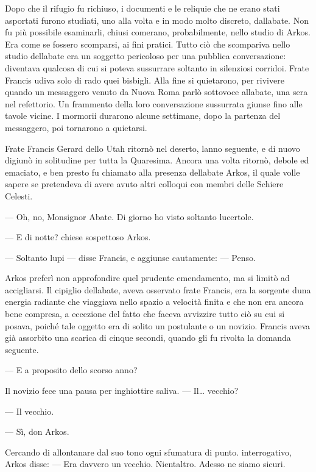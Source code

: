 Dopo che il rifugio fu richiuso, i documenti e le reliquie che ne erano
stati asportati furono studiati, uno alla volta e in modo molto
discreto, dall\textquotesingle abate. Non fu più possibile esaminarli,
chiusi com\textquotesingle erano, probabilmente, nello studio di Arkos.
Era come se fossero scomparsi, ai fini pratici. Tutto ciò che scompariva
nello studio dell\textquotesingle abate era un soggetto pericoloso per
una pubblica conversazione: diventava qualcosa di cui si poteva
sussurrare soltanto in silenziosi corridoi. Frate Francis udiva solo di
rado quei bisbigli. Alla fine si quietarono, per rivivere quando un
messaggero venuto da Nuova Roma parlò sottovoce
all\textquotesingle abate, una sera nel refettorio. Un frammento della
loro conversazione sussurrata giunse fino alle tavole vicine. I mormorii
durarono alcune settimane, dopo la partenza del messaggero, poi
tornarono a quietarsi.

Frate Francis Gerard dello Utah ritornò nel deserto,
l\textquotesingle anno seguente, e di nuovo digiunò in solitudine per
tutta la Quaresima. Ancora una volta ritornò, debole ed emaciato, e ben
presto fu chiamato alla presenza dell\textquotesingle abate Arkos, il
quale volle sapere se pretendeva di avere avuto altri colloqui con
membri delle Schiere Celesti.

--- Oh, no, Monsignor Abate. Di giorno ho visto soltanto lucertole.

--- E di notte? chiese sospettoso Arkos.

--- Soltanto lupi --- disse Francis, e aggiunse cautamente: --- Penso.

Arkos preferì non approfondire quel prudente emendamento, ma si limitò
ad accigliarsi. Il cipiglio dell\textquotesingle abate, aveva osservato
frate Francis, era la sorgente d\textquotesingle una energia radiante
che viaggiava nello spazio a velocità finita e che non era ancora bene
compresa, a eccezione del fatto che faceva avvizzire tutto ciò su cui si
posava, poiché tale oggetto era di solito un postulante o un novizio.
Francis aveva già assorbito una scarica di cinque secondi, quando gli fu
rivolta la domanda seguente.

--- E a proposito dello scorso anno?

Il novizio fece una pausa per inghiottire saliva. --- Il\ldots{}
vecchio?

--- Il vecchio.

--- Sì, don Arkos.

Cercando di allontanare dal suo tono ogni sfumatura di punto.
interrogativo, Arkos disse: --- Era davvero un vecchio.
Nient\textquotesingle altro. Adesso ne siamo sicuri.

